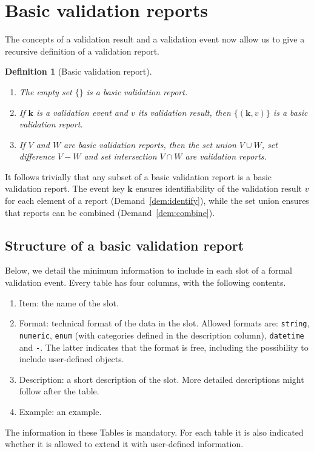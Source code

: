 \documentclass[a4paper, 11pt]{article}
\newtheorem{definition}{Definition}
\newcommand{\code}[1]{\texttt{#1}}
\newcommand{\la}[1]{\boldsymbol{#1}}
\begin{document}
 
\section{Basic validation reports}
The concepts of a validation result and a validation event now allow us to 
give a recursive definition of a validation report.
%
\begin{definition}[Basic validation report]\leavevmode
\begin{enumerate}[topsep=0pt,itemsep=0pt]
\item The empty set $\{\}$ is a basic validation report.
\item If $\la{k}$ is a validation event and $v$ its validation result, then $\{(\la{k},v)\}$
is a basic validation report.
\item If $V$ and $W$ are basic validation reports, then the set union $V\cup
W$, set difference $V-W$ and set intersection $V\cap W$ are validation reports.
\end{enumerate}
\end{definition}
%
It follows trivially that any subset of a basic validation report is a
basic validation report. The event key $\la{k}$ ensures identifiability of the
validation result $v$ for each element of a report (Demand~\ref{dem:identify}),
while the set union ensures that reports can be combined
(Demand~\ref{dem:combine}).


\subsection{Structure of a basic validation report}
Below, we detail the minimum information to include in each slot of a formal 
validation event. Every table has four columns, with the following contents.
\begin{enumerate}
\item Item: the name of the slot.
\item Format: technical format of the data in the slot. Allowed formats are: \code{string},
\code{numeric}, \code{enum} (with categories defined in the description column), \code{datetime} and
\code{-}. The latter indicates that the format is free, including the possibility to include user-defined objects.
\item Description: a short description of the slot. More detailed descriptions
might follow after the table.
\item Example: an example.
\end{enumerate}
%
The information in these Tables is mandatory. For each table it is also
indicated whether it is allowed to extend it with user-defined information.
\end{document}

